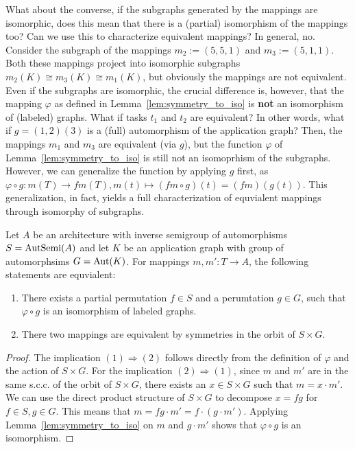 What about the converse, if the subgraphs generated by the mappings are isomorphic, does this mean that there is a (partial) isomorphism of the mappings too?
Can we use this to characterize equivalent mappings? In general, no.
Consider the subgraph of the mappings $m_2 := (5,5,1)$ and $m_3 := (5,1,1)$.
Both these mappings project into isomorphic subgraphs $m_2(K) \cong m_3(K) \cong m_1(K)$, but obviously the mappings are not equivalent.
Even if the subgraphs are isomorphic, the crucial difference is, however, that the mapping $\varphi$ as defined in Lemma~\ref{lem:symmetry_to_iso} is \textbf{not} an isomorphism of (labeled) graphs. 
What if tasks $t_1$ and $t_2$ are equivalent?
In other words,  what if $g = (1,2)(3)$ is a (full) automorphism of the application graph?
Then, the mappings $m_1$ and $m_3$ are equivalent (via $g$), but the function $\varphi$ of Lemma~\ref{lem:symmetry_to_iso} is still not an isomoprhism of the subgraphs.
However, we can generalize the function by applying $g$ first, as $\varphi \circ g : m(T) \rightarrow fm(T), m(t) \mapsto (fm \circ g)(t) = (fm)(g(t))$.
This generalization, in fact, yields a full characterization of equvialent mappings through isomorphy of subgraphs.
\begin{theorem}
Let $A$ be an architecture with inverse semigroup of automorphisms $S = \operatorname{AutSemi}(A)$ and let $K$ be an application graph with group of automorphsims $G = \operatorname{Aut}(K)$.
For mappings $m,m' : T \rightarrow A$, the following statements are equvialent:
\begin{enumerate}
\item There exists a partial permutation $f \in S$ and a perumtation $g \in G$, such that $\varphi \circ g$ is an isomorphism of labeled graphs.
\item There two mappings are equivalent by symmetries in the orbit of $S \times G$.
\end{enumerate}
\begin{proof}
The implication $(1) \Rightarrow (2)$ follows directly from the definition of $\varphi$ and the action of $S \times G$.
For the implication $(2) \Rightarrow (1)$, since $m$ and $m'$ are in the same \ac{s.c.c.} of the orbit of $S \times G$, there exists an $x \in S \times G$ such that $m = x \cdot m'$.
We can use the direct product structure of $S \times G$ to decompose $ x = fg$ for $f \in S, g \in G$.
This means that $m = fg \cdot m' = f \cdot (g \cdot m')$.
Applying Lemma~\ref{lem:symmetry_to_iso} on $m$ and $g \cdot m'$ shows that $\varphi \circ g$ is an isomorphism.
\end{proof}
\end{theorem}

